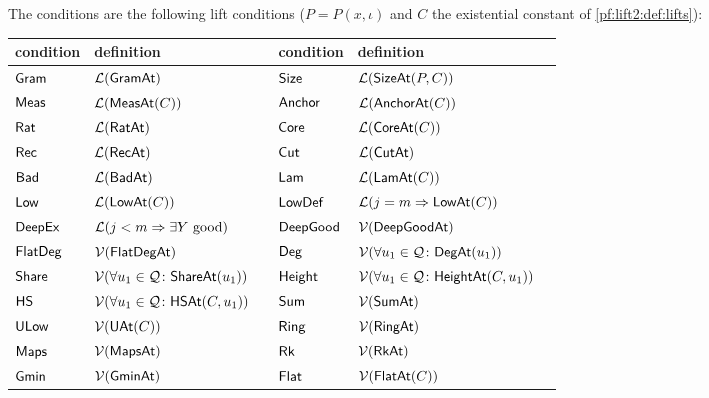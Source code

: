 \begin{definition}\label{pf:lift2:def:conds}
The conditions are the following lift conditions ($P=P(x,\iota)$ and $C$ the existential constant of
\cref{pf:lift2:def:lifts}):
\begin{center}\small
\begin{tabular}{@{}lll@{\qquad}lll@{}}
\toprule
condition & definition & & condition & definition &\\
\midrule
$\mathsf{Gram}$ & $\mathcal{L}(\mathsf{GramAt})$ & & $\mathsf{Size}$ & $\mathcal{L}(\mathsf{SizeAt}(P,C))$ &\\
$\mathsf{Meas}$ & $\mathcal{L}(\mathsf{MeasAt}(C))$ & & $\mathsf{Anchor}$ & $\mathcal{L}(\mathsf{AnchorAt}(C))$ &\\
$\mathsf{Rat}$ & $\mathcal{L}(\mathsf{RatAt})$ & & $\mathsf{Core}$ & $\mathcal{L}(\mathsf{CoreAt}(C))$ &\\
$\mathsf{Rec}$ & $\mathcal{L}(\mathsf{RecAt})$ & & $\mathsf{Cut}$ & $\mathcal{L}(\mathsf{CutAt})$ &\\
$\mathsf{Bad}$ & $\mathcal{L}(\mathsf{BadAt})$ & & $\mathsf{Lam}$ & $\mathcal{L}(\mathsf{LamAt}(C))$ &\\
$\mathsf{Low}$ & $\mathcal{L}(\mathsf{LowAt}(C))$ & & $\mathsf{LowDef}$ & $\mathcal{L}(j=m\Rightarrow\mathsf{LowAt}(C))$ &\\
$\mathsf{DeepEx}$ & $\mathcal{L}(j<m\Rightarrow\exists Y\text{ good})$ & & $\mathsf{DeepGood}$ & $\mathcal{V}(\mathsf{DeepGoodAt})$ &\\
$\mathsf{FlatDeg}$ & $\mathcal{V}(\mathsf{FlatDegAt})$ & & $\mathsf{Deg}$ & $\mathcal{V}(\forall u_1\in\mathcal Q\colon\mathsf{DegAt}(u_1))$ &\\
$\mathsf{Share}$ & $\mathcal{V}(\forall u_1\in\mathcal Q\colon\mathsf{ShareAt}(u_1))$ & & $\mathsf{Height}$ & $\mathcal{V}(\forall u_1\in\mathcal Q\colon\mathsf{HeightAt}(C,u_1))$ &\\
$\mathsf{HS}$ & $\mathcal{V}(\forall u_1\in\mathcal Q\colon\mathsf{HSAt}(C,u_1))$ & & $\mathsf{Sum}$ & $\mathcal{V}(\mathsf{SumAt})$ &\\
$\mathsf{ULow}$ & $\mathcal{V}(\mathsf{UAt}(C))$ & & $\mathsf{Ring}$ & $\mathcal{V}(\mathsf{RingAt})$ &\\
$\mathsf{Maps}$ & $\mathcal{V}(\mathsf{MapsAt})$ & & $\mathsf{Rk}$ & $\mathcal{V}(\mathsf{RkAt})$ &\\
$\mathsf{Gmin}$ & $\mathcal{V}(\mathsf{GminAt})$ & & $\mathsf{Flat}$ & $\mathcal{V}(\mathsf{FlatAt}(C))$ &\\

\end{tabular}
\end{center}
\end{definition}
